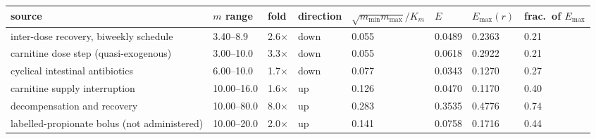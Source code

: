 \begin{tabular}{@{}>{\raggedright\arraybackslash}p{}lllllll@{}}
\toprule
\textbf{source} & \textbf{$m$ range} & \textbf{fold} & \textbf{direction} & \textbf{$\sqrt{m_{\min}m_{\max}}/K_m$} & \textbf{$E$} & \textbf{$E_{\max}(r)$} & \textbf{frac.\ of $E_{\max}$} \\
\midrule
inter-dose recovery, biweekly schedule & 3.40--8.9 & 2.6$\times$ & down & 0.055 & 0.0489 & 0.2363 & 0.21 \\
carnitine dose step (quasi-exogenous) & 3.00--10.0 & 3.3$\times$ & down & 0.055 & 0.0618 & 0.2922 & 0.21 \\
cyclical intestinal antibiotics & 6.00--10.0 & 1.7$\times$ & down & 0.077 & 0.0343 & 0.1270 & 0.27 \\
carnitine supply interruption & 10.00--16.0 & 1.6$\times$ & up & 0.126 & 0.0470 & 0.1170 & 0.40 \\
decompensation and recovery & 10.00--80.0 & 8.0$\times$ & up & 0.283 & 0.3535 & 0.4776 & 0.74 \\
labelled-propionate bolus (not administered) & 10.00--20.0 & 2.0$\times$ & up & 0.141 & 0.0758 & 0.1716 & 0.44 \\
\bottomrule
\end{tabular}
